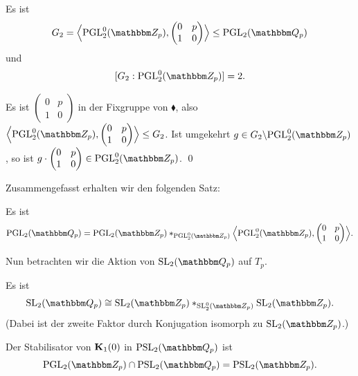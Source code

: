 \documentclass[a4paper, 12pt, twoside]{article}
\begin{document}
\PROP Es ist
\[
G_2 = \Bigl\lag \PGL_2^0(\ZZ_p),
\begin{pmatrix}
0 & p \\
1 & 0
\end{pmatrix}
\Bigr\rag
\leq\PGL_2(\QQ_p)
\]
und
\[
[G_2:\PGL_2^0(\ZZ_p)]=2.
\]

\bew Es ist $\begin{pmatrix}
0 & p \\
1 & 0
\end{pmatrix}$ in der Fixgruppe von $\blacklozenge$, also
$\Bigl\lag \PGL_2^0(\ZZ_p),
\begin{pmatrix}
0 & p \\
1 & 0
\end{pmatrix}
\Bigr\rag\leq G_2$. Ist umgekehrt $g\in
G_2\backslash\PGL_2^0(\ZZ_p)$, so ist
$g\cdot
\begin{pmatrix}
0 & p \\
1 & 0
\end{pmatrix}
\in\PGL_2^0(\ZZ_p)$.
\qed

Zusammengefasst erhalten wir den folgenden Satz:

\SATZ Es ist
\[
\PGL_2(\QQ_p) =
\PGL_2(\ZZ_p) *_{\PGL_2^0(\ZZ_p)} \Bigl\lag \PGL_2^0(\ZZ_p),
\begin{pmatrix}
0 & p \\
1 & 0
\end{pmatrix}
\Bigr\rag.
\]

Nun betrachten wir die Aktion von $\SL_2(\QQ_p)$ auf $T_p$.

\FOLG Es ist
\[
\SL_2(\QQ_p) \cong \SL_2(\ZZ_p) *_{\SL_2^0(\ZZ_p)} \SL_2(\ZZ_p).
\]
(Dabei ist der zweite Faktor durch Konjugation
isomorph zu $\SL_2(\ZZ_p)$.)

\bew Der Stabilisator von $\mathbf{K}_1(0)$ in $\PSL_2(\QQ_p)$
ist 
\[
\PGL_2(\ZZ_p)\cap\PSL_2(\QQ_p)=\PSL_2(\ZZ_p).
\]
\end{document}
